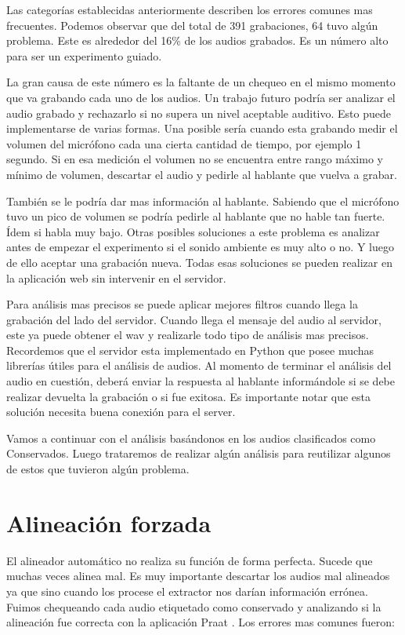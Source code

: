 Las categorías establecidas anteriormente describen los errores comunes mas frecuentes. Podemos observar que del total de 391 grabaciones, 64 tuvo algún problema. Este es alrededor del 16\% de los audios grabados. Es un número alto para ser un experimento guiado. 

La gran causa de este número es la faltante de un chequeo en el mismo momento que va grabando cada uno de los audios. Un trabajo futuro podría ser analizar el audio grabado y rechazarlo si no supera un nivel aceptable auditivo. Esto puede implementarse de varias formas. Una posible sería cuando esta grabando medir el volumen del micrófono cada una cierta cantidad de tiempo, por ejemplo 1 segundo. Si en esa medición el volumen no se encuentra entre rango máximo y mínimo de volumen, descartar el audio y pedirle al hablante que vuelva a grabar.

También se le podría dar mas información al hablante. Sabiendo que el micrófono tuvo un pico de volumen se podría pedirle al hablante que no hable tan fuerte. Ídem si habla muy bajo. Otras posibles soluciones a este problema es analizar antes de empezar el experimento si el sonido ambiente es muy alto o no. Y luego de ello aceptar una grabación nueva. Todas esas soluciones se pueden realizar en la aplicación web sin intervenir en el servidor.

Para análisis mas precisos se puede aplicar mejores filtros cuando llega la grabación del lado del servidor. Cuando llega el mensaje del audio al servidor, este ya puede obtener el wav y realizarle todo tipo de análisis mas precisos. Recordemos que el servidor esta implementado en Python que posee muchas librerías útiles para el análisis de audios. Al momento de terminar el análisis del audio en cuestión, deberá enviar la respuesta al hablante informándole si se debe realizar devuelta la grabación o si fue exitosa. Es importante notar que esta solución necesita buena conexión para el server. 

Vamos a continuar con el análisis basándonos en los audios clasificados como Conservados. Luego trataremos de realizar algún análisis para reutilizar algunos de estos que tuvieron algún problema. 

\section{Alineación forzada}

El alineador automático no realiza su función de forma perfecta. Sucede que muchas veces alinea mal. Es muy importante descartar los audios mal alineados ya que sino cuando los procese el extractor nos darían información errónea. Fuimos chequeando cada audio etiquetado como conservado y analizando si la alineación fue correcta con la aplicación Praat \cite{praat}. Los errores mas comunes fueron:

